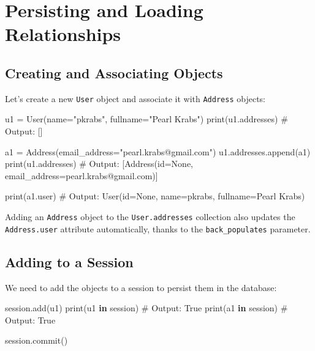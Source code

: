 \documentclass[
  letterpaper,
  DIV=11,
  numbers=noendperiod]{scrreprt}
\newenvironment{Shaded}{\begin{snugshade}}{\end{snugshade}}
\newcommand{\BuiltInTok}[1]{\textcolor[rgb]{0.00,0.23,0.31}{#1}}
\newcommand{\CommentTok}[1]{\textcolor[rgb]{0.37,0.37,0.37}{#1}}
\newcommand{\KeywordTok}[1]{\textcolor[rgb]{0.00,0.23,0.31}{\textbf{#1}}}
\newcommand{\NormalTok}[1]{\textcolor[rgb]{0.00,0.23,0.31}{#1}}
\newcommand{\OperatorTok}[1]{\textcolor[rgb]{0.37,0.37,0.37}{#1}}
\newcommand{\StringTok}[1]{\textcolor[rgb]{0.13,0.47,0.30}{#1}}
\begin{document}
\section{Persisting and Loading
Relationships}\label{persisting-and-loading-relationships}

\subsection{Creating and Associating
Objects}\label{creating-and-associating-objects}

Let's create a new \texttt{User} object and associate it with
\texttt{Address} objects:

\begin{Shaded}
\begin{Highlighting}[]
\NormalTok{u1 }\OperatorTok{=}\NormalTok{ User(name}\OperatorTok{=}\StringTok{"pkrabs"}\NormalTok{, fullname}\OperatorTok{=}\StringTok{"Pearl Krabs"}\NormalTok{)}
\BuiltInTok{print}\NormalTok{(u1.addresses)  }\CommentTok{\# Output: []}

\NormalTok{a1 }\OperatorTok{=}\NormalTok{ Address(email\_address}\OperatorTok{=}\StringTok{"pearl.krabs@gmail.com"}\NormalTok{)}
\NormalTok{u1.addresses.append(a1)}
\BuiltInTok{print}\NormalTok{(u1.addresses)  }\CommentTok{\# Output: [Address(id=None, email\_address=\textquotesingle{}pearl.krabs@gmail.com\textquotesingle{})]}

\BuiltInTok{print}\NormalTok{(a1.user)  }\CommentTok{\# Output: User(id=None, name=\textquotesingle{}pkrabs\textquotesingle{}, fullname=\textquotesingle{}Pearl Krabs\textquotesingle{})}
\end{Highlighting}
\end{Shaded}

Adding an \texttt{Address} object to the \texttt{User.addresses}
collection also updates the \texttt{Address.user} attribute
automatically, thanks to the \texttt{back\_populates} parameter.

\subsection{Adding to a Session}\label{adding-to-a-session}

We need to add the objects to a session to persist them in the database:

\begin{Shaded}
\begin{Highlighting}[]
\NormalTok{session.add(u1)}
\BuiltInTok{print}\NormalTok{(u1 }\KeywordTok{in}\NormalTok{ session)  }\CommentTok{\# Output: True}
\BuiltInTok{print}\NormalTok{(a1 }\KeywordTok{in}\NormalTok{ session)  }\CommentTok{\# Output: True}

\NormalTok{session.commit()}
\end{Highlighting}
\end{Shaded}
\end{document}
